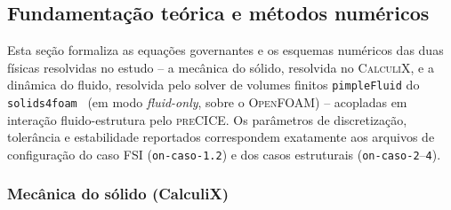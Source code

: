 %
%
%

\subsection*{Fundamentação teórica e métodos numéricos}
\label{sec:teoria}

Esta seção formaliza as equações governantes e os esquemas numéricos das duas
físicas resolvidas no estudo -- a mecânica do sólido, resolvida no
\textsc{CalculiX}, e a dinâmica do fluido, resolvida pelo solver de volumes
finitos \texttt{pimpleFluid} do \texttt{solids4foam}~\citep{Cardiff2018s4f} (em
modo \emph{fluid-only}, sobre o \textsc{OpenFOAM}) -- acopladas em interação
fluido-estrutura pelo \textsc{preCICE}. Os parâmetros de discretização,
tolerância e estabilidade reportados correspondem exatamente aos arquivos de
configuração do caso FSI (\texttt{on-caso-1.2}) e dos casos estruturais
(\texttt{on-caso-2}--\texttt{4}).

\subsubsection*{Mecânica do sólido (CalculiX)}
\label{sec:teoria-solido}

